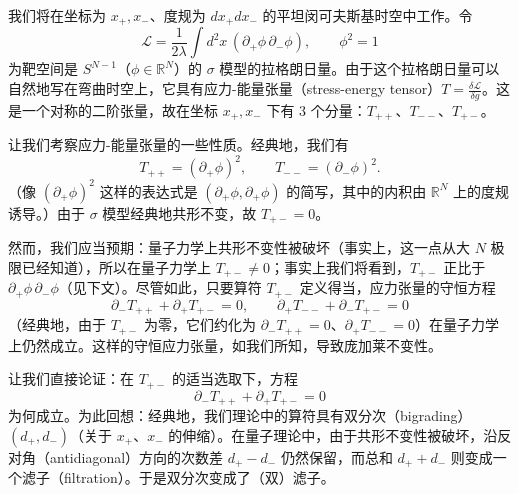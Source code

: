 我们将在坐标为 $x_+,x_-$、度规为 $dx_+dx_-$ 的平坦闵可夫斯基时空中工作。令
\begin{equation}
  \tag{4.16}
  \label{eq:4-16}
  \mathcal{L}=\frac{1}{2\lambda}\int d^2x\,(\partial_+\phi\,\partial_-\phi),\qquad \phi^2=1
\end{equation}
为靶空间是 $S^{N-1}$（$\phi\in\mathbb{R}^N$）的 $\sigma$ 模型的拉格朗日量。由于这个拉格朗日量可以自然地写在弯曲时空上，它具有应力-能量张量（stress-energy tensor）$T=\frac{\delta\mathcal{L}}{\delta g}$。这是一个对称的二阶张量，故在坐标 $x_+,x_-$ 下有 3 个分量：$T_{++}$、$T_{--}$、$T_{+-}$。

让我们考察应力-能量张量的一些性质。经典地，我们有
\begin{equation}
  \tag{4.17}
  \label{eq:4-17}
  T_{++}=(\partial_+\phi)^2,\qquad T_{--}=(\partial_-\phi)^2 .
\end{equation}
（像 $(\partial_+\phi)^2$ 这样的表达式是 $(\partial_+\phi,\partial_+\phi)$ 的简写，其中的内积由 $\mathbb{R}^N$ 上的度规诱导。）由于 $\sigma$ 模型经典地共形不变，故 $T_{+-}=0$。


然而，我们应当预期：量子力学上共形不变性被破坏（事实上，这一点从大 $N$ 极限已经知道），所以在量子力学上 $T_{+-}\ne0$；事实上我们将看到，$T_{+-}$ 正比于 $\partial_+\phi\,\partial_-\phi$（见下文）。尽管如此，只要算符 $T_{+-}$ 定义得当，应力张量的守恒方程
\begin{equation}
  \tag{4.18}
  \label{eq:4-18}
  \partial_-T_{++}+\partial_+T_{+-}=0,\qquad \partial_+T_{--}+\partial_-T_{+-}=0
\end{equation}
（经典地，由于 $T_{+-}$ 为零，它们约化为 $\partial_-T_{++}=0$、$\partial_+T_{--}=0$）在量子力学上仍然成立。这样的守恒应力张量，如我们所知，导致庞加莱不变性。

让我们直接论证：在 $T_{+-}$ 的适当选取下，方程
\begin{equation}
  \tag{4.19}
  \label{eq:4-19}
  \partial_-T_{++}+\partial_+T_{+-}=0
\end{equation}
为何成立。为此回想：经典地，我们理论中的算符具有双分次（bigrading）$(d_+,d_-)$（关于 $x_+$、$x_-$ 的伸缩）。在量子理论中，由于共形不变性被破坏，沿反对角（antidiagonal）方向的次数差 $d_+-d_-$ 仍然保留，而总和 $d_++d_-$ 则变成一个滤子（filtration）。于是双分次变成了（双）滤子。

